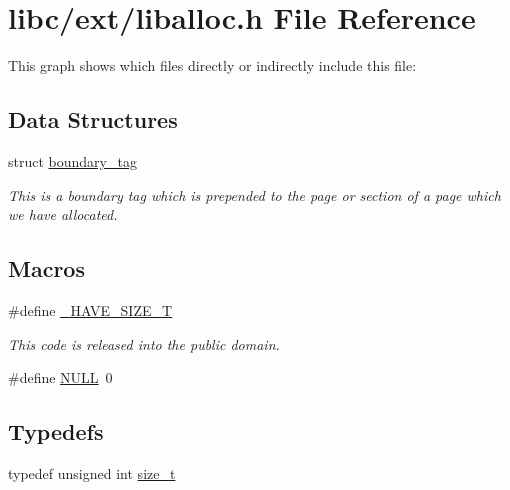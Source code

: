 \hypertarget{a00038}{}\section{libc/ext/liballoc.h File Reference}
\label{a00038}
This graph shows which files directly or indirectly include this file\+:
\subsection*{Data Structures}
\begin{DoxyCompactItemize}
\item 
struct \hyperlink{a00126}{boundary\+\_\+tag}
\begin{DoxyCompactList}\small\item\em This is a boundary tag which is prepended to the page or section of a page which we have allocated. \end{DoxyCompactList}\end{DoxyCompactItemize}
\subsection*{Macros}
\begin{DoxyCompactItemize}
\item 
\#define \hyperlink{a00038_a40684528083f4cc0dfe3ca1accae3f79_a40684528083f4cc0dfe3ca1accae3f79}{\+\_\+\+H\+A\+V\+E\+\_\+\+S\+I\+Z\+E\+\_\+T}
\begin{DoxyCompactList}\small\item\em This code is released into the public domain. \end{DoxyCompactList}\item 
\#define \hyperlink{a00038_a070d2ce7b6bb7e5c05602aa8c308d0c4_a070d2ce7b6bb7e5c05602aa8c308d0c4}{N\+U\+LL}~0
\end{DoxyCompactItemize}
\subsection*{Typedefs}
\begin{DoxyCompactItemize}
\item 
typedef unsigned int \hyperlink{a00038_a7c94ea6f8948649f8d181ae55911eeaf_a7c94ea6f8948649f8d181ae55911eeaf}{size\+\_\+t}
\end{DoxyCompactItemize}
